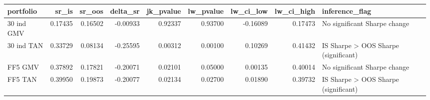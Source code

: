 \begin{tabular}{lrrrrrrrl}
\toprule
portfolio & sr\_is & sr\_oos & delta\_sr & jk\_pvalue & lw\_pvalue & lw\_ci\_low & lw\_ci\_high & inference\_flag \\
\midrule
30 ind GMV & 0.17435 & 0.16502 & -0.00933 & 0.92337 & 0.93700 & -0.16089 & 0.17473 & No significant Sharpe change \\
30 ind TAN & 0.33729 & 0.08134 & -0.25595 & 0.00312 & 0.00100 & 0.10269 & 0.41432 & IS Sharpe > OOS Sharpe (significant) \\
FF5 GMV & 0.37892 & 0.17821 & -0.20071 & 0.02101 & 0.05000 & 0.00135 & 0.40014 & No significant Sharpe change \\
FF5 TAN & 0.39950 & 0.19873 & -0.20077 & 0.02134 & 0.02700 & 0.01890 & 0.39732 & IS Sharpe > OOS Sharpe (significant) \\
\bottomrule
\end{tabular}
